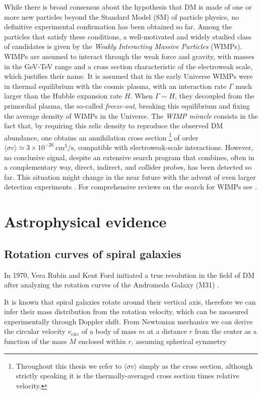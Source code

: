 While there is broad consensus about the hypothesis that DM is made of one or more new particles beyond the Standard Model (SM) of particle physics, 
no definitive experimental confirmation has been obtained so far. 
Among the particles that satisfy these conditions, a well-motivated and widely studied class of candidates is given by the \emph{Weakly Interacting Massive Particles} (WIMPs).
WIMPs are assumed to interact through the weak force and gravity, with masses in the GeV-TeV range and a cross section characteristic of the electroweak scale, which justifies their name.
It is assumed that in the early Universe WIMPs were in thermal equilibrium with the cosmic plasma, with an interaction rate $\Gamma$ much larger than the Hubble expansion rate $H$. When $\Gamma \sim H$, they decoupled from the primordial plasma, the so-called \emph{freeze-out}, breaking this equilibrium and fixing the average density of WIMPs in the Universe.
The \emph{WIMP miracle} consists in the fact that, by requiring this relic density to reproduce the observed DM abundance, one obtains an annihilation cross section
\footnote{Throughout this thesis we refer to $\langle\sigma v\rangle$ simply as
the cross section, although strictly speaking it is the thermally-averaged cross section times relative velocity.} 
of order $\langle\sigma v\rangle \simeq 3\times10^{-26}~\text{cm}^3/\text{s}$,
compatible with electroweak-scale interactions.
However, no conclusive signal, despite an extensive search program that combines, often in a complementary way, direct, indirect, and collider probes, has been detected so far. This situation might change in the near
future with the advent of even larger detection experiments \cite{profumo, Arcadi_2025}.
For comprehensive reviews on the search for WIMPs see \cite{Bergstr_m_2000,Jungman_1996}.


\section{Astrophysical evidence}

\subsection{Rotation curves of spiral galaxies}

In 1970, Vera Rubin and Kent Ford initiated a true revolution in the field of DM after analyzing the rotation curves of 
the Andromeda Galaxy (M31) \cite{Ford}.

It is known that spiral galaxies rotate around their vertical axis, therefore we can infer their mass distribution from the rotation velocity, which can be measured experimentally through Doppler shift.
From Newtonian mechanics we can derive the circular velocity $v_{\mathrm{circ}}$ of a body of mass $m$ at a distance $r$ from the center as a function of the mass $M$ enclosed within $r$, assuming spherical symmetry


